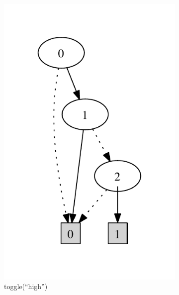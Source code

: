\begin{figure}
\begin{subfigure}[b]{0.15\textwidth}
        \includegraphics[width=\textwidth]{figures/bdd2.pdf}
        \caption{toggle(``high'')}
        \label{fig:bdd2}
    \end{subfigure}
    ~ 
    \begin{subfigure}[b]{0.15\textwidth}

\end{subfigure}
\end{figure}
